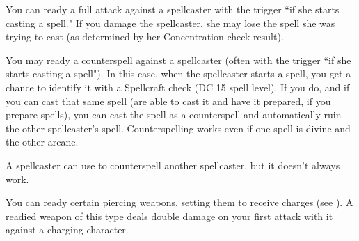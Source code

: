  You can ready a full attack against a spellcaster with the trigger ``if she starts casting a spell." If you damage
the spellcaster, she may lose the spell she was trying to cast (as determined by her Concentration check result).

 You may ready a counterspell against a spellcaster (often with the trigger ``if she starts casting a spell"). In this case, when the spellcaster starts a spell, you get a chance to identify it with a Spellcraft check (DC 15 \add spell level). If you do, and if you can cast that same spell (are able to cast it and have it prepared, if you prepare spells), you can cast the spell as a counterspell and automatically ruin the other spellcaster's spell. Counterspelling works even if one spell is divine and the other arcane.

A spellcaster can use  to counterspell another spellcaster, but it doesn't always work.

 You can ready certain piercing weapons, setting them to receive charges (see ). A readied weapon of this type deals double damage on your first attack with it against a charging character.
